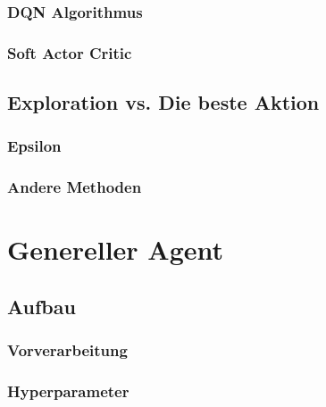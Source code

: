 \documentclass[a4paper,titlepage]{article}
\numberwithin{equation}{section} %
\begin{document}
{\subsubsection{DQN Algorithmus}
\subsubsection{Soft Actor Critic}

\subsection{Exploration vs. Die beste Aktion}

\subsubsection{Epsilon}

\subsubsection{Andere Methoden}



\section{Genereller Agent}


\subsection{Aufbau}

\subsubsection{Vorverarbeitung}

\subsubsection{Hyperparameter}



}
\end{document}
